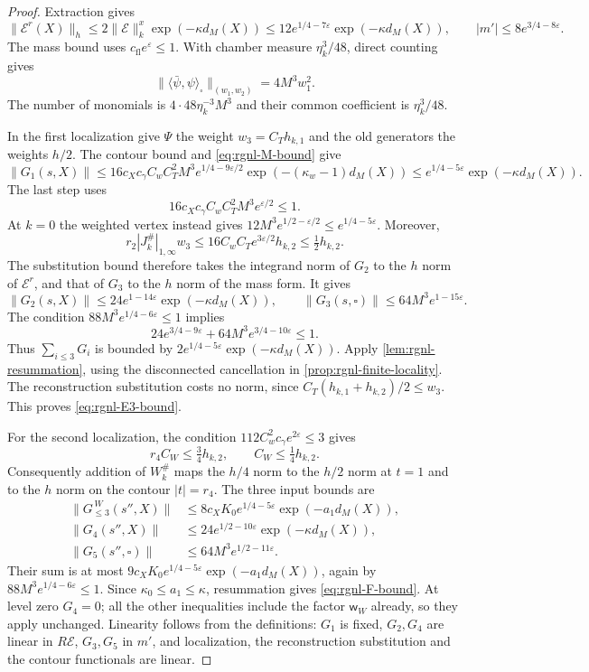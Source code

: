 \documentclass[11pt,letterpaper,reqno]{amsart}
\begin{document}
\begin{proof}
Extraction gives
\[
 \|\mathscr E^r(X)\|_h\le2\|\mathscr E\|_k^x\exp(-\kappa d_M(X))
                   \le12e^{1/4-7\varepsilon}\exp(-\kappa d_M(X)),
 \qquad |m'|\le8e^{3/4-8\varepsilon}.
\]
The mass bound uses
$c_{\mathrm{fl}}e^\varepsilon\le1$.
With chamber measure $\eta_k^3/48$, direct counting gives
\[
 \|\langle\bar\psi,\psi\rangle_\square\|_{(w_1,w_2)}
                                                    =4M^3w_1^2.
\]
The number of monomials is
$4\cdot48\eta_k^{-3}M^3$ and their common coefficient
is $\eta_k^3/48$.

In the first localization give $\Psi$ the weight
$w_3=C_Th_{k,1}$ and the old generators the weights $h/2$.
The contour bound and \eqref{eq:rgnl-M-bound} give
\[
 \|G_1(s,X)\|\le
 16c_Xc_\gamma C_wC_T^2M^3e^{1/4-9\varepsilon/2}
                 \exp(-(\kappa_w-1)d_M(X))
 \le e^{1/4-5\varepsilon}\exp(-\kappa d_M(X)).
\]
The last step uses
\[
 16c_Xc_\gamma C_wC_T^2M^3e^{\varepsilon/2}\le1.
\]
At $k=0$ the weighted vertex instead gives
$12M^3e^{1/2-\varepsilon/2}\le e^{1/4-5\varepsilon}$.
Moreover,
\[
 r_2|J_k^\#|_{1,\infty}w_3
     \le16C_wC_Te^{3\varepsilon/2}h_{k,2}
     \le\tfrac12h_{k,2}.
\]
The substitution bound therefore takes the integrand norm
of $G_2$ to the $h$ norm of $\mathscr E^r$, and that of
$G_3$ to the $h$ norm of the mass form. It gives
\[
 \|G_2(s,X)\|\le24e^{1-14\varepsilon}\exp(-\kappa d_M(X)),
 \qquad \|G_3(s,\square)\|\le64M^3e^{1-15\varepsilon}.
\]
The condition $88M^3e^{1/4-6\varepsilon}\le1$ implies
\[
 24e^{3/4-9\varepsilon}
                   +64M^3e^{3/4-10\varepsilon}\le1.
\]
Thus $\sum_{i\le3}G_i$ is bounded by
$2e^{1/4-5\varepsilon}\exp(-\kappa d_M(X))$.
Apply \cref{lem:rgnl-resummation}, using the disconnected
cancellation in \cref{prop:rgnl-finite-locality}.
The reconstruction substitution costs no norm, since
$C_T(h_{k,1}+h_{k,2})/2\le w_3$.
This proves \eqref{eq:rgnl-E3-bound}.

For the second localization, the condition
$112C_w^2c_\gamma e^{2\varepsilon}\le3$ gives
\[
 r_4C_W\le\tfrac34h_{k,2},\qquad C_W\le\tfrac14h_{k,2}.
\]
Consequently addition of $W_k^\#$ maps the $h/4$ norm
to the $h/2$ norm at $t=1$ and to the $h$ norm on
the contour $|t|=r_4$. The three input bounds are
\begin{align*}
 \|G_{\le3}^{\,W}(s'',X)\|
       &\le8c_XK_0e^{1/4-5\varepsilon}\exp(-a_1d_M(X)),\\
 \|G_4(s'',X)\|&\le24e^{1/2-10\varepsilon}\exp(-\kappa d_M(X)),\\
 \|G_5(s'',\square)\|&\le64M^3e^{1/2-11\varepsilon}.
\end{align*}
Their sum is at most
$9c_XK_0e^{1/4-5\varepsilon}\exp(-a_1d_M(X))$,
again by $88M^3e^{1/4-6\varepsilon}\le1$.
Since $\kappa_0\le a_1\le\kappa$, resummation gives
\eqref{eq:rgnl-F-bound}.
At level zero $G_4=0$; all the other inequalities include
the factor $\mathsf w_W$ already, so they apply unchanged.
Linearity follows from the definitions: $G_1$ is fixed,
$G_2,G_4$ are linear in $R\mathscr E$, $G_3,G_5$ in $m'$,
and localization, the reconstruction substitution and the
contour functionals are linear.
\end{proof}
\end{document}
